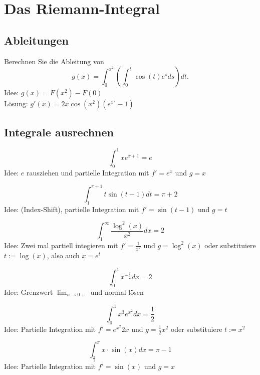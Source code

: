 \section{Das Riemann-Integral}

\subsection{Ableitungen}
Berechnen Sie die Ableitung von
\begin{displaymath}
  g(x) = \int_{0}^{x^2} \left(\int_{0}^{t} \cos(t)e^s ds\right)dt.
\end{displaymath}
Idee: $g(x) = F(x^2) - F(0)$\\
Lösung: $g'(x) = 2x \cos(x^2) \left(e^{x^2} - 1\right)$

\subsection{Integrale ausrechnen}
\begin{displaymath}
  \int_{0}^{1} xe^{x + 1} = e
\end{displaymath}
Idee: $e$ rausziehen und partielle Integration mit $f' = e^x$ und $g = x$

\begin{displaymath}            
  \int_{1}^{\pi + 1} t\sin(t - 1)dt = \pi + 2                                   
\end{displaymath}
Idee: (Index-Shift), partielle Integration mit $f' = \sin(t - 1)$ und $g = t$

\begin{displaymath}
  \int_{1}^{\infty} \frac{\log^2(x)}{x^2} dx = 2
\end{displaymath}
Idee: Zwei mal partiell integieren mit $f' = \frac{1}{x^2}$ und $g = \log^2(x)$ oder substituiere $t := \log(x)$, also auch $x = e^t$

\begin{displaymath}
  \int_{0}^{1} x^{-\frac{1}{2}} dx = 2
\end{displaymath}
Idee: Grenzwert $\lim_{n \to 0+}$ und normal lösen

\begin{displaymath}
  \int_{0}^{1} x^3e^{x^2} dx = \frac{1}{2}
\end{displaymath}
Idee: Partielle Integration mit $f' = e^{x^2}2x$ und $g = \frac{1}{2}x^2$ oder substituiere $t := x^2$

\begin{displaymath}
  \int_{\frac{\pi}{2}}^{\pi} x \cdot \sin(x) dx = \pi - 1
\end{displaymath}
Idee: Partielle Integration mit $f' = \sin(x)$ und $g = x$


